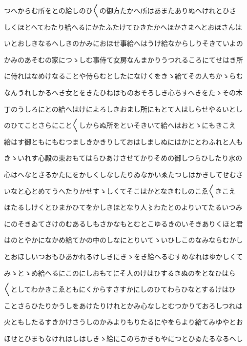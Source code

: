\documentclass[a4paper,11pt,landscape]{ltjtarticle}
\begin{document}
\par\medskip
つへからむ所をとの給しのひ〱の御方たかへ所はあまたありぬへけれとひさ
\par\medskip
しくほとへてわたり給へるにかたふたけてひきたかへほかさまへとおほさんは
\par\medskip
いとおしきなるへしきのかみにおほせ事給へはうけ給なからしりそきていよの
\par\medskip
かみのあそむの家につゝしむ事侍て女房なんまかりうつれるころにてせはき所
\par\medskip
に侍れはなめけなることや侍らむとしたになけくをきゝ給てその人ちかゝらむ
\par\medskip
なんうれしかるへき女とをきたひねはものおそろしき心ちすへきをたゝその木
\par\medskip
丁のうしろにとの給へはけによろしきおまし所にもとて人はしらせやるいとし
\par\medskip
のひてことさらにこと〱しからぬ所をといそきいて給へはおとゝにもきこえ
\par\medskip
給はす御ともにもむつましきかきりしておはしましぬにはかにとわふれと人も
\par\medskip
きゝいれす心殿の東おもてはらひあけさせてかりそめの御しつらひしたり水の
\par\medskip
心はへなとさるかたにをかしくしなしたりゐなかいゑたつしはかきしてせむさ
\par\medskip
いなと心とめてうへたりかせすゝしくてそこはかとなきむしのこゑ〱きこえ
\par\medskip
ほたるしけくとひまかひてをかしきほとなり人〻わたとのよりいてたるいつみ
\par\medskip
にのそきゐてさけのむあるしもさかなもとむとこゆるきのいそきありくほと君
\par\medskip
はのとやかになかめ給てかの中のしなにとりいてゝいひしこのなみならむかし
\par\medskip
とおほしいつおもひあかれるけしきにきゝをき給へるむすめなれはゆかしくて
\par\medskip
みゝとゝめ給へるにこのにしおもてにそ人のけはひするきぬのをとなひはら
\par\medskip
〱としてわかきこゑともにくからすさすかにしのひてわらひなとするけはひ
\par\medskip
ことさらひたりかうしをあけたりけれとかみ心なしとむつかりておろしつれは
\par\medskip
火ともしたるすきかけさうしのかみよりもりたるにやをらより給てみゆやとお
\par\medskip
ほせとひまもなけれはしはしきゝ給にこのちかきもやにつとひゐたるなるへし
\par\medskip
\end{document}
